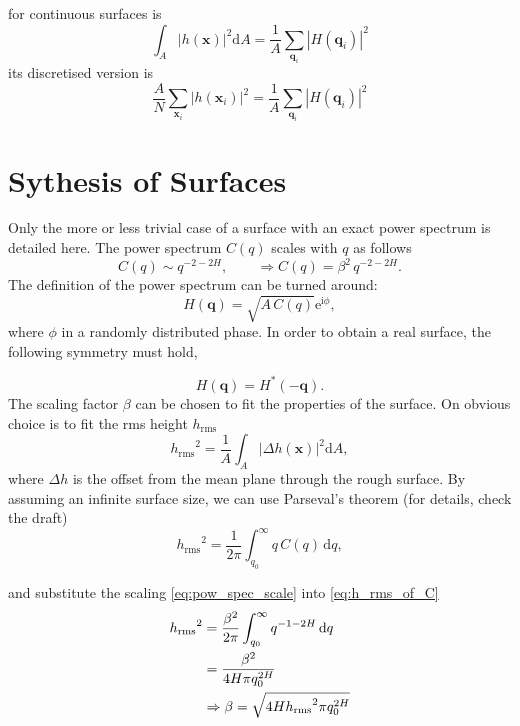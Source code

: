 \documentclass[a4paper,twosides]{article}
\renewcommand{\d}{\ensuremath{\mathrm{d}}}
\newcommand{\e}{\ensuremath{\mathrm{e}}}
\renewcommand{\i}{\ensuremath{\mathrm{i}}}
\renewcommand{\vec}[1]{\ensuremath{\boldsymbol{#1}}}
\newcommand{\abs}[1]{\ensuremath{\left|#1\right|}}
\newcommand{\hrms}[1]{\ensuremath{h_{\mathrm{rms}}}}
\begin{document}
for continuous surfaces is 
\begin{equation}
  \label{eq:cont_parseval}
  \int_A\abs{h(\vec x)}^2\d A = \frac{1}{A}\sum_{\vec q_i}\abs{H(\vec q_i)}^2
\end{equation}
its discretised version is
\begin{equation}
  \label{eq:parseval}
  \frac{A}{N}\sum_{\vec x_i}\abs{h(\vec x_i)}^2 = \frac{1}{A}\sum_{\vec q_i}\abs{H(\vec q_i)}^2
\end{equation}

\section{Sythesis of Surfaces}
\label{sec:synthesis}

Only the more or less trivial case of a surface with an exact power spectrum is detailed here. The power spectrum $C(q)$ scales with $q$ as follows \citep{Persson2005}
\begin{equation}
  \label{eq:pow_spec_scale}
  C(q) \sim q^{-2-2H}, \qquad \Rightarrow C(q) = \beta^2\,q^{-2-2H}.
\end{equation}
The definition of the power spectrum can be turned around:
\begin{equation}
  \label{eq:coeffs}
  H(\vec q) = \sqrt{A\, C(q)} \e^{\i\phi},
\end{equation}
where $\phi$ in a randomly distributed phase. In order to obtain a real surface, the following symmetry must hold,

\begin{equation}
  \label{eq:symmetry}
  H(\vec q) = H^*(-\vec q).
\end{equation}
The scaling factor $\beta$ can be chosen to fit the properties of the surface. On obvious choice is to fit the rms height \hrms.
\begin{equation}
  {\hrms{}}^2 = \frac1A\int_A\abs{\Delta h(\vec x)}^2\d A,
\end{equation}
where $\Delta h$ is the offset from the mean plane through the rough surface. By assuming an infinite surface size, we can use Parseval's theorem (for details, check the draft)
\begin{equation}
  \label{eq:h_rms_of_C}
  {\hrms{}}^2 = \frac1{2\pi}\int_{q_0}^\infty q\, C(q)\,\d q,
\end{equation}

and substitute the scaling \eqref{eq:pow_spec_scale} into \eqref{eq:h_rms_of_C}
\begin{align}
  \label{eq:beta}
  {\hrms{}}^2 &= \frac{\beta^2}{2\pi}\int_{q_0}^\infty q^{-1-2H}\,\d q \notag\\
  &=\frac{\beta^2}{4H\pi q_0^{2H}}\\
  &\Rightarrow \beta = \sqrt{4H{\hrms{}}^2\pi q_0^{2H}}
\end{align}

\end{document}
